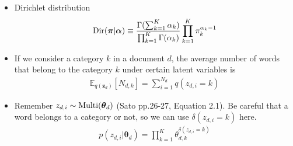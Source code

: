\documentclass[a4paper,10.5pt,dvipdfmx]{jarticle}  %
\begin{document}
\begin{itemize}
\item Dirichlet distribution
\begin{align}
	{\rm Dir}(\boldsymbol{\pi} | \boldsymbol{\alpha}) \equiv \frac{\Gamma(\sum_{k=1}^{K} \alpha_k)}{\prod_{k=1}^{K} \Gamma(\alpha_k)} \prod_{k=1}^{K} \pi_{k}^{\alpha_k - 1} 
\end{align}
\item If we consider a category $k$ in a document $d$, the average number of words that belong to the category $k$ under certain latent variables is
\begin{align}
	\mathbb{E}_{q(\boldsymbol{z}_d)}[N_{d,k}] = \sum_{i=1}^{N_d} q(z_{d,i} = k) \label{Eq:N_dk}
\end{align}
\item Remember $z_{d,i} \sim {\rm Multi}(\boldsymbol{\theta}_d)$ (Sato pp.26-27, Equation 2.1). Be careful that a word belongs to a category or not, so we can use $\delta(z_{d,i}=k)$ here.
\begin{align}
	p(z_{d,i} | \boldsymbol{\theta}_d) = \prod_{k=1}^{K} \theta_{d,k}^{\delta(z_{d,i} = k)}
\end{align}
\end{itemize}
\end{document}
